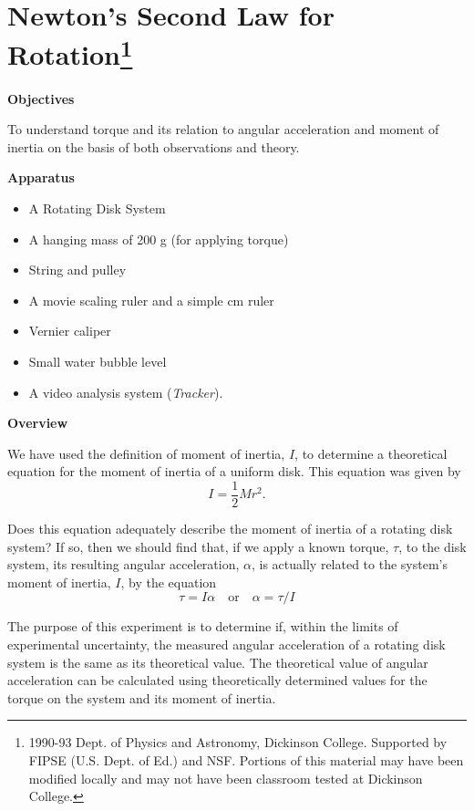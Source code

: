 
\section{Newton's Second Law for Rotation\footnote{
1990-93 Dept. of Physics and Astronomy, Dickinson College. Supported by FIPSE
(U.S. Dept. of Ed.) and NSF. Portions of this material may have been modified
locally and may not have been classroom tested at Dickinson College.
}}

\makelabheader %

\textbf{Objectives} 

To understand torque and its relation to angular acceleration and moment of
inertia on the basis of both observations and theory. 

\textbf{Apparatus}

\begin{itemize}
\item A Rotating Disk System 
\item A hanging mass of 200 g (for applying torque) 
\item String and pulley
\item A movie scaling ruler and a simple cm ruler
\item Vernier caliper
\item Small water bubble level
\item A video analysis system (\textit{Tracker}).
\end{itemize}
\textbf{Overview} 

We have used the definition of moment of inertia, $I$, to determine a theoretical equation for the moment of inertia of a uniform disk. This equation was given by
\[
I=\frac{1}{2}Mr^{2}.\]


Does this equation adequately describe the moment of inertia of a rotating
disk system? If so, then we should find that, if we apply a known torque, \( \tau  \), to the disk system, its resulting angular acceleration, \( \alpha  \), is actually related to the system's moment of inertia, $I$, by the equation
\[
\tau =I\alpha \quad \mbox{or}\quad \alpha =\tau /I\]


The purpose of this experiment is to determine if, within the limits of experimental
uncertainty, the measured angular acceleration of a rotating disk system is
the same as its theoretical value. The theoretical value of angular acceleration can be calculated using theoretically determined values for the torque on the
system and its moment of inertia.

